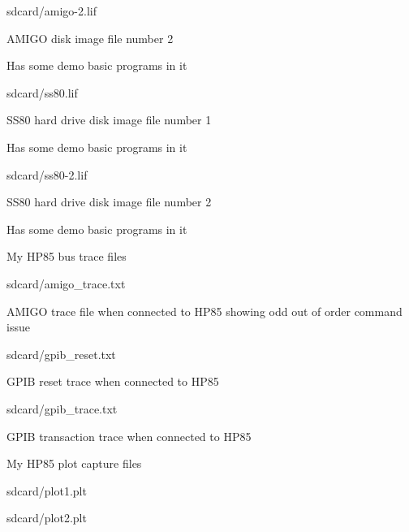 \begin{DoxyItemize}
\begin{DoxyItemize}
\begin{DoxyItemize}
\begin{DoxyItemize}
\end{DoxyItemize}
\item sdcard/amigo-\/2.\+lif
\begin{DoxyItemize}
\item A\+M\+I\+GO disk image file number 2
\item Has some demo basic programs in it
\end{DoxyItemize}
\item sdcard/ss80.\+lif
\begin{DoxyItemize}
\item S\+S80 hard drive disk image file number 1
\item Has some demo basic programs in it
\end{DoxyItemize}
\item sdcard/ss80-\/2.\+lif
\begin{DoxyItemize}
\item S\+S80 hard drive disk image file number 2
\item Has some demo basic programs in it
\end{DoxyItemize}
\end{DoxyItemize}
\item My H\+P85 bus trace files
\begin{DoxyItemize}
\item sdcard/amigo\+\_\+trace.\+txt
\begin{DoxyItemize}
\item A\+M\+I\+GO trace file when connected to H\+P85 showing odd out of order command issue
\end{DoxyItemize}
\item sdcard/gpib\+\_\+reset.\+txt
\begin{DoxyItemize}
\item G\+P\+IB reset trace when connected to H\+P85
\end{DoxyItemize}
\item sdcard/gpib\+\_\+trace.\+txt
\begin{DoxyItemize}
\item G\+P\+IB transaction trace when connected to H\+P85
\end{DoxyItemize}
\end{DoxyItemize}
\item My H\+P85 plot capture files
\begin{DoxyItemize}
\item sdcard/plot1.\+plt
\item sdcard/plot2.\+plt 

 
\end{DoxyItemize}
\end{DoxyItemize}
\end{DoxyItemize}